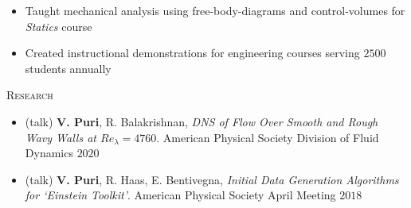 \documentclass[10pt]{article}
\begin{document}
\begin{multicols}{2}
\vspace{-1.75em}
\begin{itemize}[label=-,leftmargin=1.0em]
    \setlength\itemsep{-0.25em}
    \item Taught mechanical analysis using free-body-diagrams and control-volumes for \textit{Statics} course
    \item Created instructional demonstrations for engineering courses serving $2500$ students annually
\end{itemize}
\vspace{-2.0em}

\end{multicols}
\vspace{-1.5em}
\begin{multicols}{2}
\textsc{Research}
\columnbreak

\vspace{-1.75em}
\begin{itemize}[label= ,leftmargin= 1.0em]
    \setlength{\itemindent}{-1.0em}
    \setlength\itemsep{-0.25em}
    \item (talk) \textbf{V. Puri}, R. Balakrishnan, \textit{DNS of Flow Over Smooth and Rough Wavy Walls at $\mathit{Re}_\lambda=4760$}. American Physical Society Division of Fluid Dynamics $2020$
    \item (talk) \textbf{V. Puri}, R. Haas, E. Bentivegna, \textit{Initial Data Generation Algorithms for `Einstein Toolkit'}. American Physical Society April Meeting $2018$
\end{itemize}
\vspace{-2.0em}

\end{multicols}
\end{document}
